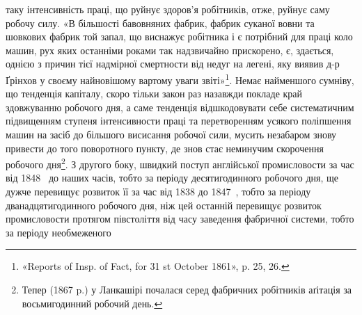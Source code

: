 \parcont{}  %
таку інтенсивність праці, що руйнує здоров’я робітників, отже,
руйнує саму робочу силу. «В більшості бавовняних фабрик, фабрик
суканої вовни та шовкових фабрик той запал, що виснажує
робітника і є потрібний для праці коло машин, рух яких останніми
роками так надзвичайно прискорено, є, здається, однією
з причин тієї надмірної смертности від недуг на легені, яку виявив
д-р Ґрінхов у своєму найновішому вартому уваги звіті»\footnote{
«Reports of Insp. of Fact, for 31 st October 1861», p. 25, 26.
}.
Немає найменшого сумніву, що тенденція капіталу, скоро тільки
закон раз назавжди покладе край здовжуванню робочого дня,
а саме тенденція відшкодовувати себе систематичним підвищенням
ступеня інтенсивности праці та перетворенням усякого поліпшення
машин на засіб до більшого висисання робочої сили, мусить
незабаром знову привести до того поворотного пункту, де знов
стає неминучим скорочення робочого дня\footnote{
Тепер (1867 p.) у Ланкашірі почалася серед фабричних робітників
аґітація за восьмигодинний робочий день.
}. З другого боку,
швидкий поступ англійської промисловости за час від 1848~ до
наших часів, тобто за періоду десятигодинного робочого дня, ще
дужче перевищує розвиток її за час від 1838 до 1847~, тобто за
періоду дванадцятигодинного робочого дня, ніж цей останній
перевищує розвиток промисловости протягом півстоліття від часу
заведення фабричної системи, тобто за періоду необмеженого
